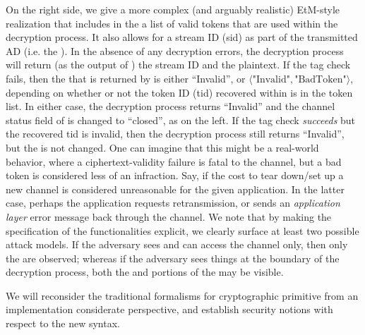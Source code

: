 On the right side, we give a more complex (and arguably realistic) EtM-style realization that includes
in the  a list of valid tokens that are used within
the decryption process. It also allows for a stream ID (sid) as part
of the transmitted AD (i.e. the ).  In the
absence of any decryption errors, the decryption process will return
(as the output of ) the stream ID and the
plaintext.  If the tag check fails, then the
 that is returned by  is either
``Invalid'', or $\langle\mbox{"Invalid"},\mbox{"BadToken"}\rangle$,
depending on whether or not the token ID (tid) recovered within
 is in the token list.  In either case, the
decryption process returns ``Invalid'' and the channel status field
of  is changed to ``closed'', as on the left.
If the tag check \emph{succeeds} but the recovered tid is invalid,
then the decryption process still returns ``Invalid'', but the
 is not changed.  One can imagine that this might be a real-world
  behavior, where a ciphertext-validity failure is fatal to the
  channel, but a bad token is considered less of an infraction. 
  Say, if the cost to tear down/set up a new
  channel is considered unreasonable for the given application. In the
  latter case, perhaps the application requests retransmission, or sends an
  \emph{application layer} error message back through the channel.
We note that by making the specification of the functionalities
explicit, we clearly surface at least two possible attack models.  If
the adversary sees and can access the channel only, then only the
 are observed; whereas if the adversary sees
things at the boundary of the decryption process, both the
 and portions of the 
may be visible.



\begin{task}
{We will reconsider the traditional formalisms for cryptographic primitive from an implementation considerate perspective, and establish security notions with respect to the new syntax. }
\end{task}

